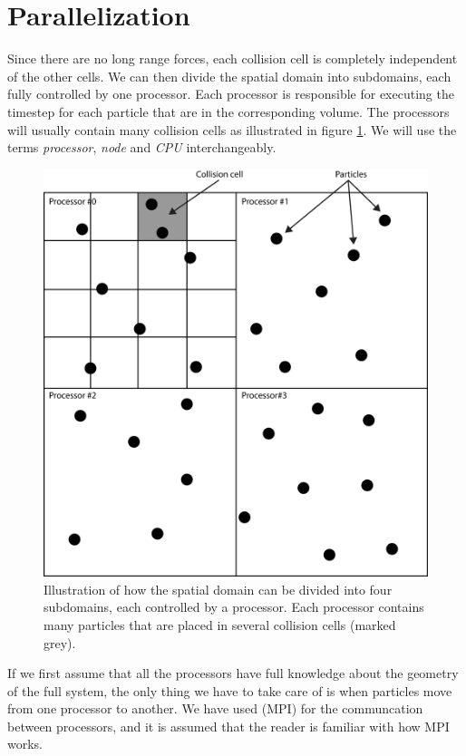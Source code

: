 \section{Parallelization}
Since there are no long range forces, each collision cell is completely independent of the other cells. We can then divide the spatial domain into subdomains, each fully controlled by one processor. Each processor is responsible for executing the timestep for each particle that are in the corresponding volume. The processors will usually contain many collision cells as illustrated in figure \ref{fig:dsmc_parallelization_1}. We will use the terms \textit{processor}, \textit{node} and \textit{CPU} interchangeably.
\begin{figure}[h]
\begin{center}
\includegraphics[width=\textwidth, trim=0cm 0cm 0cm 0cm, clip]{DSMC/figures/parallelization.eps}
\end{center}
\caption{Illustration of how the spatial domain can be divided into four subdomains, each controlled by a processor. Each processor contains many particles that are placed in several collision cells (marked grey).}
\label{fig:dsmc_parallelization_1}
\end{figure}
If we first assume that all the processors have full knowledge about the geometry of the full system, the only thing we have to take care of is when particles move from one processor to another. We have used (MPI) for the communcation between processors, and it is assumed that the reader is familiar with how MPI works. 
